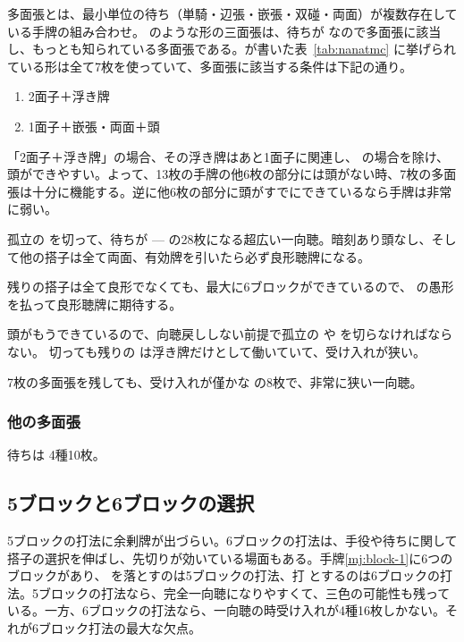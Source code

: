 \documentclass[10pt, twocolumn]{article}
\begin{document}
多面張とは、最小単位の待ち（単騎・辺張・嵌張・双碰・両面）が複数存在している手牌の組み合わせ。 のような形の三面張は、待ちが  なので多面張に該当し、もっとも知られている多面張である。\citet[pp. 124--125]{uzaku-haikouritsu}が書いた表~\ref{tab:nanatmc} に挙げられている形は全て7枚を使っていて、多面張に該当する条件は下記の通り。

\begin{enumerate}
\item 2面子＋浮き牌
\item 1面子＋嵌張・両面＋頭
\end{enumerate}

「2面子＋浮き牌」の場合、その浮き牌はあと1面子に関連し、 の場合を除け、頭ができやすい。よって、13枚の手牌の他6枚の部分には頭がない時、7枚の多面張は十分に機能する。逆に他6枚の部分に頭がすでにできているなら手牌は非常に弱い。


孤立の  を切って、待ちが  ---  の28枚になる超広い一向聴。暗刻あり頭なし、そして他の搭子は全て両面、有効牌を引いたら必ず良形聴牌になる。


残りの搭子は全て良形でなくても、最大に6ブロックができているので、 の愚形を払って良形聴牌に期待する。


頭がもうできているので、向聴戻ししない前提で孤立の  や  を切らなければならない。 切っても残りの  は浮き牌だけとして働いていて、受け入れが狭い。


7枚の多面張を残しても、受け入れが僅かな  の8枚で、非常に狭い一向聴。

\subsubsection*{他の多面張}


待ちは  4種10枚。

\subsection{5ブロックと6ブロックの選択}

5ブロックの打法に余剰牌が出づらい。6ブロックの打法は、手役や待ちに関して搭子の選択を伸ばし、先切りが効いている場面もある\citep[][p. 17]{uzaku-haikouritsu}。手牌\ref{mj:block-1}に6つのブロックがあり、 を落とすのは5ブロックの打法、打  とするのは6ブロックの打法。5ブロックの打法なら、完全一向聴になりやすくて、三色の可能性も残っている。一方、6ブロックの打法なら、一向聴の時受け入れが4種16枚しかない。それが6ブロック打法の最大な欠点\citep[][p. 18]{uzaku-haikouritsu}。
\end{document}
